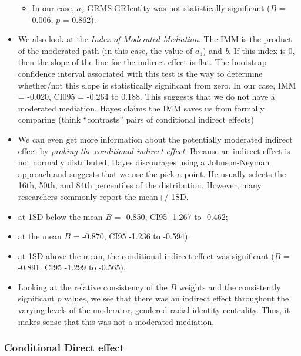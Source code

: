\documentclass[
  11pt,
]{book}
\providecommand{\tightlist}{%
  \setlength{\itemsep}{0pt}\setlength{\parskip}{0pt}}
\begin{document}
\begin{itemize}
  \begin{itemize}
  \tightlist
  \item
    In our case, \(a_{3}\) GRMS:GRIcntlty was not statistically significant (\(B\) = 0.006, \(p\) = 0.862).
  \end{itemize}
\item
  We also look at the \emph{Index of Moderated Mediation}. The IMM is the product of the moderated path (in this case, the value of \(a_{3}\)) and \emph{b}. If this index is 0, then the slope of the line for the indirect effect is flat. The bootstrap confidence interval associated with this test is the way to determine whether/not this slope is statistically significant from zero. In our case, IMM = -0.020, CI095 = -0.264 to 0.188. This suggests that we do not have a moderated mediation. Hayes claims the IMM saves us from formally comparing (think ``contrasts'' pairs of conditional indirect effects)
\item
  We can even get more information about the potentially moderated indirect effect by \emph{probing the conditional indirect effect}. Because an indirect effect is not normally distributed, Hayes discourages using a Johnson-Neyman approach and suggests that we use the pick-a-point. He usually selects the 16th, 50th, and 84th percentiles of the distribution. However, many researchers commonly report the mean+/-1SD.
\item
  at 1SD below the mean \(B\) = -0.850, CI95 -1.267 to -0.462;
\item
  at the mean \(B\) = -0.870, CI95 -1.236 to -0.594).\\
\item
  at 1SD above the mean, the conditional indirect effect was significant (\(B\) = -0.891, CI95 -1.299 to -0.565).\\
\item
  Looking at the relative consistency of the \(B\) weights and the consistently significant \(p\) values, we see that there was an indirect effect throughout the varying levels of the moderator, gendered racial identity centrality. Thus, it makes sense that this was not a moderated mediation.
\end{itemize}

\hypertarget{conditional-direct-effect}{%
\subsubsection{Conditional Direct effect}\label{conditional-direct-effect}}
\end{document}
